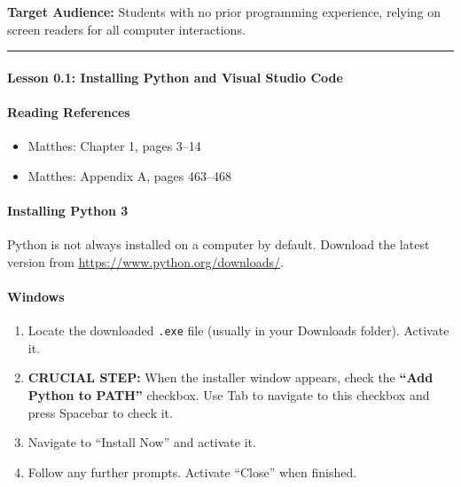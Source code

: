 \documentclass[
  justified,
  openright,
]{tufte-book}
\let\subsection\paragraph
\let\paragraph\paragraph
\let\subsection\paragraph
\let\paragraph\paragraph
\providecommand{\tightlist}{%
  \setlength{\itemsep}{0pt}\setlength{\parskip}{0pt}}
\begin{document}
\textbf{Target Audience:} Students with no prior programming experience,
relying on screen readers for all computer interactions.

\begin{center}\rule{0.5\linewidth}{0.5pt}\end{center}

\subsection{Lesson 0.1: Installing Python and Visual Studio
Code}\label{lesson-0.1-installing-python-and-visual-studio-code}

\subsection{Reading References}\label{reading-references}

\begin{itemize}
\tightlist
\item
  Matthes: Chapter 1, pages 3--14
\item
  Matthes: Appendix A, pages 463--468
\end{itemize}

\subsection{Installing Python 3}\label{installing-python-3}

Python is not always installed on a computer by default. Download the
latest version from \url{https://www.python.org/downloads/}.

\paragraph{Windows}\label{windows}

\begin{enumerate}
\def\labelenumi{\arabic{enumi}.}
\tightlist
\item
  Locate the downloaded \texttt{.exe} file (usually in your Downloads
  folder). Activate it.
\item
  \textbf{CRUCIAL STEP:} When the installer window appears, check the
  \textbf{``Add Python to PATH''} checkbox. Use Tab to navigate to this
  checkbox and press Spacebar to check it.
\item
  Navigate to ``Install Now'' and activate it.
\item
  Follow any further prompts. Activate ``Close'' when finished.
\end{enumerate}
\end{document}
